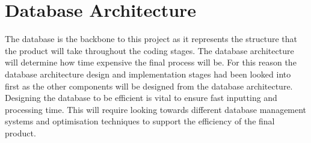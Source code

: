 \documentclass{report}
\begin{document}
\clearpage
\section{Database Architecture}
The database is the backbone to this project as it represents the structure that the product will take throughout the coding stages. The database architecture will determine how time expensive the final process will be. For this reason the database architecture design and implementation stages had been looked into first as the other components will be designed from the database architecture. Designing the database to be efficient is vital to ensure fast inputting and processing time. This will require looking towards different database management systems and optimisation techniques to support the efficiency of the final product. 
\end{document}

